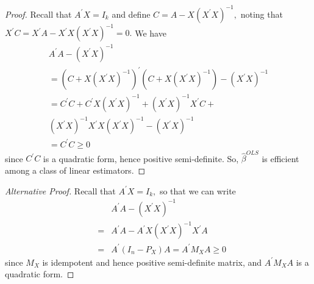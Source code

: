 \documentclass[notes=show]{beamer}
\begin{document}
\begin{frame}%

\begin{proof}
Recall that $A^{\prime }X=I_{k}$ and define $C=A-X\left( X^{\prime }X\right)
^{-1},$ noting that $X^{\prime }C=X^{\prime }A-X^{\prime }X\left( X^{\prime
}X\right) ^{-1}=0.$ We have 
\begin{gather*}
A^{\prime }A-(X^{\prime }X)^{-1} \\
=\left( C+X\left( X^{\prime }X\right) ^{-1}\right) ^{\prime }\left(
C+X\left( X^{\prime }X\right) ^{-1}\right) -(X^{\prime }X)^{-1} \\
=C^{\prime }C+C^{\prime }X\left( X^{\prime }X\right) ^{-1}+\left( X^{\prime
}X\right) ^{-1}X^{\prime }C+ \\
\left( X^{\prime }X\right) ^{-1}X^{\prime }X\left( X^{\prime }X\right)
^{-1}-(X^{\prime }X)^{-1} \\
=C^{\prime }C\geq 0
\end{gather*}%
since $C^{\prime }C$ is a quadratic form, hence positive semi-definite. So, $%
\widehat{\beta }^{OLS}$ is efficient among a class of linear estimators.
\end{proof}

\end{frame}%

\begin{frame}%

\begin{proof}[Alternative Proof]

Recall that $A^{\prime }X=I_{k},$ so that we can write 
\begin{eqnarray*}
&&A^{\prime }A-(X^{\prime }X)^{-1} \\
&=&A^{\prime }A-A^{\prime }X(X^{\prime }X)^{-1}X^{\prime }A \\
&=&A^{\prime }(I_{n}-P_{X})A=A^{\prime }M_{X}A\geq 0
\end{eqnarray*}%
since $M_{X}$ is idempotent and hence positive semi-definite matrix, and $%
A^{\prime }M_{X}A$ is a quadratic form.
\end{proof}

\end{frame}%
\end{document}
